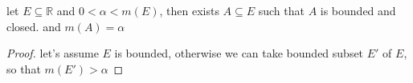 \documentclass[11pt,a4paper]{article}
\begin{document}
\begin{exercise}
    let $E \subseteq \mathbb{R}$ and $0 < \alpha < m(E)$, then exists $A \subseteq E$ 
    such that $A$ is bounded and closed. and $m(A) = \alpha$
\end{exercise}

\begin{proof}
    let's assume $E$ is bounded, otherwise we can take bounded subset $E'$ of $E$, so that  $m(E') > \alpha$
\end{proof}
\end{document}
